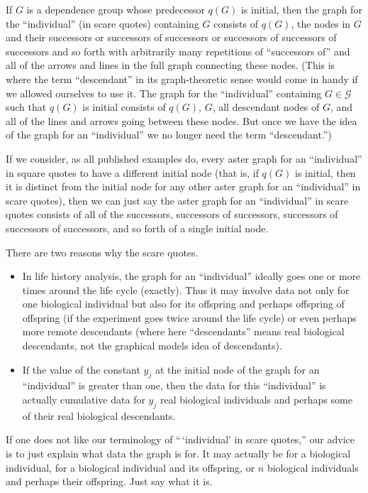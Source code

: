 If $G$ is a dependence group whose
predecessor $q(G)$ is initial, then the graph for the ``individual''
(in scare quotes) containing $G$ consists of $q(G)$, the nodes in $G$
and their successors or successors of successors or successors of successors
of successors and so forth with arbitrarily many repetitions
of ``successors of'' and all of the arrows and lines in the full graph
connecting these nodes.
(This is where the term ``descendant'' in its graph-theoretic sense would
come in handy if we allowed ourselves to use it.  The graph for the
``individual'' containing $G \in \mathcal{G}$ such that $q(G)$ is initial
consists of $q(G)$, $G$, all descendant nodes of $G$,
and all of the lines and arrows going between these nodes.  But once we
have the idea of the graph for an ``individual'' we no longer need the
term ``descendant.'')

If we consider, as all published examples do, every aster graph for an
``individual'' in square quotes to have a different initial node (that is,
if $q(G)$ is initial, then it is distinct from the initial node for any
other aster graph for an ``individual'' in scare quotes), then we can
just say the aster graph for an ``individual'' in scare quotes consists
of all of the successors, successors of successors, successors of successors
of successors, and so forth of a single initial node.

There are two reasons why the scare quotes.
\begin{itemize}
\item In life history
analysis, the graph for an ``individual'' ideally goes one or more times
around the life cycle (exactly).  Thus it may involve data not only for
one biological individual but also for its offspring and perhaps offspring
of offspring (if the experiment goes twice around the life cycle) or even
perhaps more remote descendants (where here ``descendants'' means real
biological descendants, not the graphical models idea of descendants).
\item If the value of the constant $y_j$ at the initial node of the
graph for an ``individual'' is greater than one, then the data for this
``individual'' is actually cumulative data for $y_j$ real biological
individuals and perhaps some of their real biological descendants.
\end{itemize}

If one does not like our terminology of ``\,`individual' in scare quotes,''
our advice is to just explain what data the graph is for.  It may actually
be for a biological individual, for a biological individual
and its offspring, or $n$ biological individuals and perhaps their offspring.
Just say what it is.

